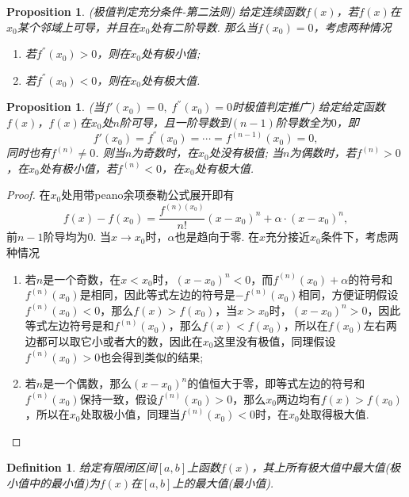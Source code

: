 \documentclass{article}
\newtheorem{proposition}[theorem]{Proposition}
\newtheorem{definition}[theorem]{Definition}
\begin{document}
\begin{proposition}
\rm {\color{red} (极值判定充分条件-第二法则)} \rm 给定连续函数$f(x)$，若$f(x)$在$x_0$某个邻域上可导，并且在$x_0$处有二阶导数. 那么当$f(x_0) = 0$，考虑两种情况
\begin{enumerate}
	\item 若$f^{''}(x_0) > 0$，则在$x_0$处有极小值;
	\item 若$f^{''}(x_0) < 0$，则在$x_0$处有极大值.
\end{enumerate}
\end{proposition}

\begin{proposition}
\rm {\color{red} (当$f'(x_0) = 0,\; f^{''}(x_0) = 0$时极值判定推广)} 给定给定函数$f(x)$，$f(x)$在$x_0$处$n$阶可导，且一阶导数到$(n-1)$阶导数全为$0$，即
$$
f'(x_0) = f^{''}(x_0) = \cdots = f^{(n-1)}(x_0) = 0,
$$
同时也有$f^{(n)} \neq 0$. 则当$n$为奇数时，在$x_0$处没有极值; 当$n$为偶数时，若$f^{(n)} > 0$，在$x_0$处有极小值，若$f^{(n)} < 0$，在$x_0$处有极大值.
\end{proposition}

\begin{proof}
在$x_0$处用带peano余项泰勒公式展开即有
$$
f(x) - f(x_0) = \frac{f^{(n)(x_0)}}{n!}(x-x_0)^n + \alpha\cdot( x-x_0)^n,
$$
前$n-1$阶导均为0. 当$x \rightarrow x_0$时，$\alpha$也是趋向于零. 在$x$充分接近$x_0$条件下，考虑两种情况
\begin{enumerate}
\item 若$n$是一个奇数，在$x < x_0$时，$(x-x_0)^n < 0$，而$f^{(n)}(x_0)+\alpha$的符号和$f^{(n)}(x_0)$是相同，因此等式左边的符号是$-f^{(n)}(x_0)$相同，方便证明假设$f^{(n)}(x_0) < 0$，那么$f(x) > f(x_0)$，当$x > x_0$时，$(x-x_0)^n > 0$，因此等式左边符号是和$f^{(n)}(x_0)$，那么$f(x) < f(x_0)$，所以在$f(x_0)$左右两边都可以取它小或者大的数，因此在$x_0$这里没有极值，同理假设$f^{(n)}(x_0) > 0$也会得到类似的结果;

\item 若$n$是一个偶数，那么$(x-x_0)^n$的值恒大于零，即等式左边的符号和$f^{(n)}(x_0)$保持一致，假设$f^{(n)}(x_0) > 0$，那么$x_0$两边均有$f(x) > f(x_0)$，所以在$x_0$处取极小值，同理当$f^{(n)}(x_0) < 0$时，在$x_0$处取得极大值.
\end{enumerate}
\end{proof}

\begin{definition}
\rm 给定有限闭区间$[a,b]$上函数$f(x)$，其上所有极大值中最大值(极小值中的最小值)为$f(x)$在$[a,b]$上的{\color{red}最大值(最小值)}.
\end{definition}
\end{document}
